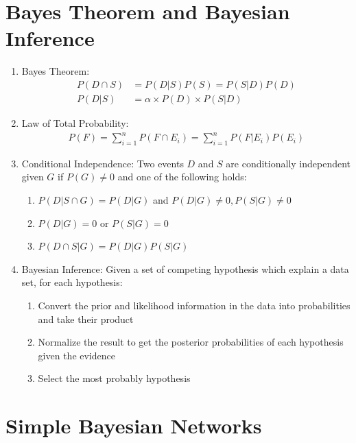 \documentclass[12pt,twoside]{article}
\begin{document}



\section{Bayes Theorem and Bayesian Inference}

\begin{enumerate}
\item Bayes Theorem: 
\begin{align*}
P(D\cap S ) &= P(D\vert S)P(S) = P(S \vert D) P(D)\\
P(D\vert S) & = \alpha \times P(D) \times P(S\vert D)
\end{align*}

\item Law of Total Probability:
\begin{align*}
P(F) = \sum_{i=1}^n P(F\cap E_i) = \sum_{i=1}^n P(F\vert E_i)P(E_i)
\end{align*}

\item Conditional Independence: Two events $D$ and $S$ are conditionally independent given $G$  if $P(G) \neq 0$ and one of the following holds:
\begin{enumerate}
\item $P(D\vert S\cap G) = P(D\vert G)$ and $P(D\vert G)\neq 0, P(S\vert G)\neq 0$ 
\item $P(D\vert G) = 0$ or $P(S\vert G)=0$
\item $P(D\cap S\vert G)=P(D\vert G)P(S\vert G)$
\end{enumerate}

\item Bayesian Inference: Given a set of competing hypothesis which explain a data set, for each hypothesis:
\begin{enumerate}
\item Convert the prior and likelihood information in the data into probabilities and take their product
\item Normalize the result to get the posterior probabilities of each hypothesis given the evidence
\item Select the most probably hypothesis
\end{enumerate}
\end{enumerate}

\newpage

\section{Simple Bayesian Networks}
\end{document}
